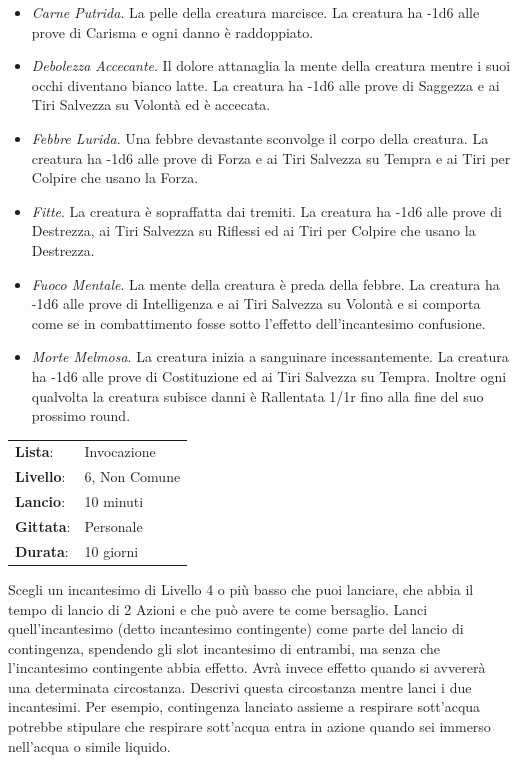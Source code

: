 \begin{multicols}{2}
\begin{itemize}[leftmargin=*] \setlength{\itemsep}{0pt}
	\item \emph{Carne Putrida}. La pelle della creatura marcisce. La creatura ha -1d6 alle prove di Carisma e ogni danno è raddoppiato.
	\item \emph{Debolezza Accecante}. Il dolore attanaglia la mente della creatura mentre i suoi occhi diventano bianco latte. La creatura ha -1d6 alle prove di Saggezza e ai Tiri Salvezza su Volontà ed è accecata.
	\item \emph{Febbre Lurida}. Una febbre devastante sconvolge il corpo della creatura. La creatura ha -1d6 alle prove di Forza e ai Tiri Salvezza su Tempra e ai Tiri per Colpire che usano la Forza.
	\item \emph{Fitte}. La creatura è sopraffatta dai tremiti. La creatura ha -1d6 alle prove di Destrezza, ai Tiri Salvezza su Riflessi ed ai Tiri per Colpire che usano la Destrezza.
	\item \emph{Fuoco Mentale}. La mente della creatura è preda della febbre. La creatura ha -1d6 alle prove di Intelligenza e ai Tiri Salvezza su Volontà e si comporta come se in combattimento fosse sotto l'effetto dell'incantesimo confusione.
	\item \emph{Morte Melmosa}. La creatura inizia a sanguinare incessantemente. La creatura ha -1d6 alle prove di Costituzione ed ai Tiri Salvezza su Tempra. Inoltre ogni qualvolta la creatura subisce danni è Rallentata 1/1r fino alla fine del suo prossimo round.
\end{itemize}

\noindent\begin{tabularx}{\linewidth}{p{1.3cm}X}
	\rowcolor{gray!20}\textbf{Lista}: & Invocazione \\
	\textbf{Livello}: & 6, Non Comune \\
	\rowcolor{gray!20}\textbf{Lancio}: & 10 minuti \\
	\textbf{Gittata}: & Personale \\
	\rowcolor{gray!20}\textbf{Durata}: & 10 giorni \\
\end{tabularx}\smallskip

Scegli un incantesimo di Livello 4 o più basso che puoi lanciare, che abbia il tempo di lancio di 2 Azioni e che può avere te come bersaglio. Lanci quell'incantesimo (detto incantesimo contingente) come parte del lancio di contingenza, spendendo gli slot incantesimo di entrambi, ma senza che l'incantesimo contingente abbia effetto. Avrà invece effetto quando si avvererà una determinata circostanza. Descrivi questa circostanza mentre lanci i due incantesimi. Per esempio, contingenza lanciato assieme a respirare sott'acqua potrebbe stipulare che respirare sott'acqua entra in azione quando sei immerso nell'acqua o simile liquido.


\end{multicols}
